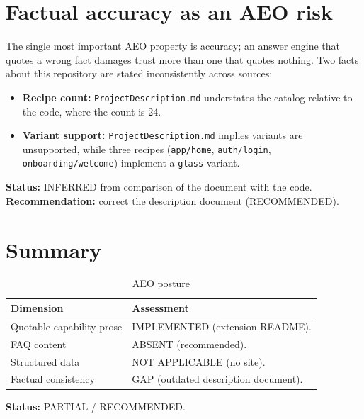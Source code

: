 \section{Factual accuracy as an AEO risk}

The single most important AEO property is accuracy; an answer engine that quotes
a wrong fact damages trust more than one that quotes nothing. Two facts about
this repository are stated inconsistently across sources:

\begin{itemize}
  \item \textbf{Recipe count:} \texttt{ProjectDescription.md} understates the
        catalog relative to the code, where the count is 24.
  \item \textbf{Variant support:} \texttt{ProjectDescription.md} implies variants
        are unsupported, while three recipes (\texttt{app/home},
        \texttt{auth/login}, \texttt{onboarding/welcome}) implement a
        \texttt{glass} variant.
\end{itemize}

\textbf{Status:} INFERRED from comparison of the document with the code.
\textbf{Recommendation:} correct the description document (RECOMMENDED).

\section{Summary}

\begin{table}[H]
\centering
\caption{AEO posture}
\begin{tabular}{@{}L{4.6cm}L{9.6cm}@{}}
\toprule
\textbf{Dimension} & \textbf{Assessment} \\
\midrule
Quotable capability prose & IMPLEMENTED (extension README). \\
FAQ content & ABSENT (recommended). \\
Structured data & NOT APPLICABLE (no site). \\
Factual consistency & GAP (outdated description document). \\
\bottomrule
\end{tabular}
\end{table}

\textbf{Status:} PARTIAL / RECOMMENDED.
